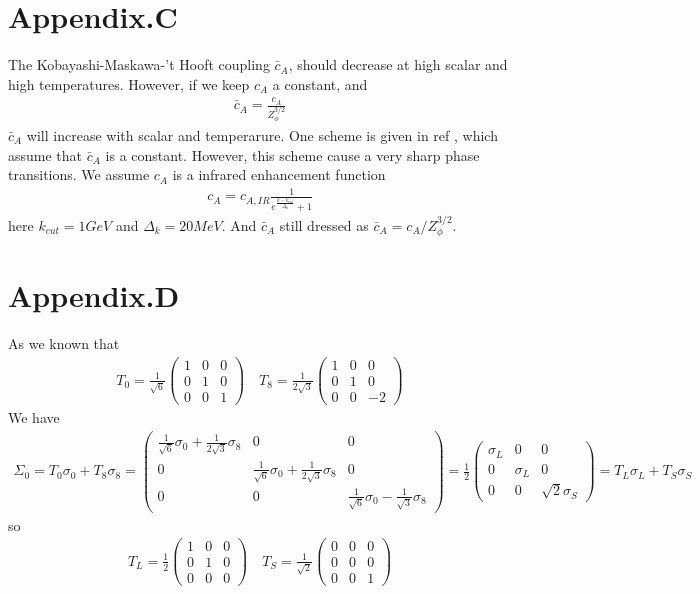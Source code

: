 \documentclass[12pt]{article}
\begin{document}
\section{Appendix.C}
The Kobayashi-Maskawa-’t Hooft coupling $\bar c_A$, should decrease
at high scalar and high temperatures. However, if we keep $c_A$ a constant,
and 
\begin{align}
\bar c_A=\frac{c_A}{Z_\phi^{3/2}}
\end{align}
$\bar c_A$ will increase with scalar and temperarure. One scheme is given in ref \cite{Rennecke:2016tkm}, which assume that $\bar c_A$ is a constant. However, this scheme cause a very sharp phase transitions. We assume  $c_A$ is a infrared enhancement function
\begin{align}
c_A=c_{A,IR}\frac{1}{e^{\frac{k-k_{cut}}{\Delta_k}}+1}
\end{align}
here $k_{cut}=1 GeV$ and $\Delta_k=20 MeV$. And $\bar c_A$ still dressed as $\bar c_A=c_A/Z_\phi^{3/2}$.

\section{Appendix.D}\label{appx_D}
As we known that
\begin{align}
T_0=\frac{1}{\sqrt{6}}
\begin{pmatrix}
1& 0 & 0\\
0 & 1 & 0 \\
0 & 0 & 1
\end{pmatrix} 
\quad
T_8=\frac{1}{2\sqrt{3}}
\begin{pmatrix}
1& 0 & 0\\
0 & 1 & 0 \\
0 & 0 & -2
\end{pmatrix} 
\end{align}
We have
\begin{align}
\Sigma_0=T_0 \sigma_0 +T_8 \sigma_8 
=\begin{pmatrix}
\frac{1}{\sqrt{6}}\sigma_0+\frac{1}{2\sqrt{3}}\sigma_8 & 0 & 0\\
0 & \frac{1}{\sqrt{6}}\sigma_0+\frac{1}{2\sqrt{3}}\sigma_8 & 0 \\
0 & 0 & \frac{1}{\sqrt{6}}\sigma_0-\frac{1}{\sqrt{3}}\sigma_8 
\end{pmatrix}
=\frac{1}{2}\begin{pmatrix}
\sigma_L & 0 & 0\\
0 & \sigma_L & 0 \\
0 & 0 & \sqrt{2} \sigma_S
\end{pmatrix}
=T_L \sigma_L +T_S \sigma_S
\end{align}
so 
\begin{align}
T_L=\frac{1}{2}
\begin{pmatrix}
1& 0 & 0\\
0 & 1 & 0 \\
0 & 0 & 0
\end{pmatrix} 
\quad
T_S=\frac{1}{\sqrt{2}}
\begin{pmatrix}
0& 0 & 0\\
0 & 0 & 0 \\
0 & 0 & 1
\end{pmatrix} 
\end{align}
\end{document}
